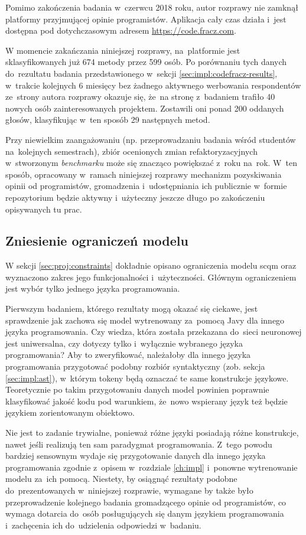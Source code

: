 \documentclass[twoside]{praca}
\begin{document}
Pomimo zakończenia badania w~czerwcu 2018 roku, autor rozprawy nie zamknął platformy przyjmującej opinie programistów. Aplikacja cały czas działa i~jest dostępna pod dotychczasowym adresem \url{https://code.fracz.com}.

W momencie zakańczania niniejszej rozprawy, na~platformie jest sklasyfikowanych już 674 metody przez 599 osób. Po porównaniu tych danych do~rezultatu badania przedstawionego w~sekcji \ref{sec:impl:codefracz-results}, w~trakcie kolejnych 6 miesięcy bez żadnego aktywnego werbowania respondentów ze~strony autora rozprawy okazuje się, że~na stronę z~badaniem trafiło 40 nowych osób zainteresowanych projektem. Zostawili oni ponad 200 oddanych głosów, klasyfikując w~ten sposób 29 następnych metod.

Przy niewielkim zaangażowaniu (np. przeprowadzaniu badania wśród studentów na~kolejnych semestrach), zbiór ocenionych zmian refaktoryzacyjnych w~stworzonym \textit{benchmarku} może się znacząco powiększać z~roku na~rok. W~ten sposób, opracowany w~ramach niniejszej rozprawy mechanizm pozyskiwania opinii od programistów, gromadzenia i~udostępniania ich publicznie w~formie repozytorium będzie aktywny i~użyteczny jeszcze długo po zakończeniu opisywanych tu prac.

\subsection{Zniesienie ograniczeń modelu}

W sekcji \ref{sec:proj:constraints} dokładnie opisano ograniczenia modelu \gls{scqm} oraz wyznaczono zakres jego funkcjonalności i~użyteczności. Głównym ograniczeniem jest wybór tylko jednego języka programowania.

Pierwszym badaniem, którego rezultaty mogą okazać się ciekawe, jest sprawdzenie jak zachowa się model wytrenowany za~pomocą Javy dla innego języka programowania. Czy wiedza, która została przekazana do~sieci neuronowej jest uniwersalna, czy dotyczy tylko i~wyłącznie wybranego języka programowania? Aby to zweryfikować, należałoby dla innego języka programowania przygotować podobny rozbiór syntaktyczny (zob. sekcja \ref{sec:impl:ast}), w~którym tokeny będą oznaczać te same konstrukcje językowe. Teoretycznie po takim przygotowaniu danych model powinien poprawnie klasyfikować jakość kodu pod warunkiem, że~nowo wspierany język też będzie językiem zorientowanym obiektowo.

Nie jest to zadanie trywialne, ponieważ różne języki posiadają różne konstrukcje, nawet jeśli realizują ten sam paradygmat programowania. Z~tego powodu bardziej sensownym wydaje się przygotowanie danych dla innego języka programowania zgodnie z~opisem w~rozdziale \ref{ch:impl} i~ponowne wytrenowanie modelu za~ich pomocą. Niestety, by osiągnąć rezultaty podobne do~prezentowanych w~niniejszej rozprawie, wymagane by także było przeprowadzenie kolejnego badania gromadzącego opinie od programistów, co wymaga dotarcia do~osób posługujących się danym językiem programowania i~zachęcenia ich do~udzielenia odpowiedzi w~badaniu.
\end{document}
